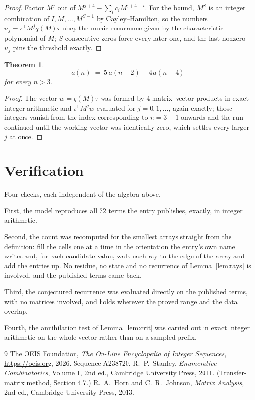 \documentclass[11pt,a4paper]{article}
\theoremstyle{plain}
\newtheorem{theorem}{Theorem}
\theoremstyle{definition}
\begin{document}
\begin{proof}
Factor $M^{j}$ out of $M^{j+4}-\sum_ic_iM^{j+4-i}$. For the bound, $M^{S}$
is an integer combination of $I,M,\dots,M^{S-1}$ by Cayley--Hamilton, so the numbers
$u_j=\iota^{\!\top}M^{j}q(M)\tau$ obey the monic recurrence given by the characteristic
polynomial of $M$; $S$ consecutive zeros force every later one, and the last nonzero $u_j$
pins the threshold exactly.
\end{proof}

\begin{theorem}
\[
a(n)\;=\;5\,a(n-2) - 4\,a(n-4)
\]
for every $n>3$.
\end{theorem}

\begin{proof}
The vector $w=q(M)\tau$ was formed by $4$ matrix--vector products in exact integer
arithmetic and $\iota^{\!\top}M^{j}w$ evaluated for $j=0,1,\dots$, again exactly; those
integers vanish from the index corresponding to $n=3+1$ onwards and the run continued
until the working vector was identically zero, which settles every larger $j$ at once.
\end{proof}

\section{Verification}

Four checks, each independent of the algebra above.

First, the model reproduces all $32$ terms the entry publishes, exactly, in integer
arithmetic.

Second, the count was recomputed for the smallest arrays straight from the definition: fill the
cells one at a time in the orientation the entry's own name writes and, for each candidate
value, walk each ray to the edge of the array and add the entries up. No residue, no state and
no recurrence of Lemma~\ref{lem:rays} is involved, and the published terms came back.

Third, the conjectured recurrence was evaluated directly on the published terms, with no
matrices involved, and holds wherever the proved range and the data overlap.

Fourth, the annihilation test of Lemma~\ref{lem:crit} was carried out in exact integer
arithmetic on the whole vector rather than on a sampled prefix.

\begin{thebibliography}{9}
 The OEIS Foundation, \emph{The On-Line Encyclopedia of Integer
Sequences}, \url{https://oeis.org}, 2026. Sequence A238720.
 R.~P.~Stanley, \emph{Enumerative Combinatorics}, Volume 1, 2nd ed.,
Cambridge University Press, 2011. (Transfer-matrix method, Section 4.7.)
 R.~A.~Horn and C.~R.~Johnson, \emph{Matrix Analysis}, 2nd ed., Cambridge
University Press, 2013.
\end{thebibliography}
\end{document}
